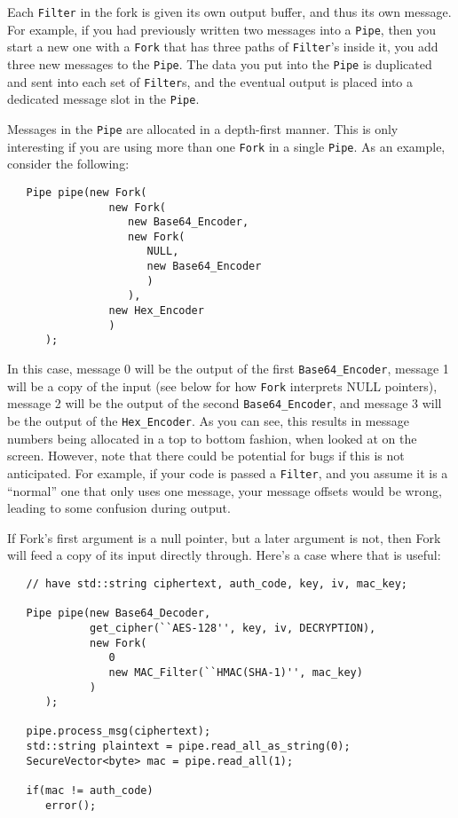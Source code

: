 \documentclass{article}
\newcommand{\type}[1]{\texttt{#1}}
\begin{document}
Each \type{Filter} in the fork is given its own output buffer, and
thus its own message. For example, if you had previously written two
messages into a \type{Pipe}, then you start a new one with a
\type{Fork} that has three paths of \type{Filter}'s inside it, you
add three new messages to the \type{Pipe}. The data you put into the
\type{Pipe} is duplicated and sent into each set of \type{Filter}s,
and the eventual output is placed into a dedicated message slot in the
\type{Pipe}.

Messages in the \type{Pipe} are allocated in a depth-first manner. This is only
interesting if you are using more than one \type{Fork} in a single \type{Pipe}.
As an example, consider the following:

\begin{verbatim}
   Pipe pipe(new Fork(
                new Fork(
                   new Base64_Encoder,
                   new Fork(
                      NULL,
                      new Base64_Encoder
                      )
                   ),
                new Hex_Encoder
                )
      );
\end{verbatim}

In this case, message 0 will be the output of the first \type{Base64\_Encoder},
message 1 will be a copy of the input (see below for how \type{Fork} interprets
NULL pointers), message 2 will be the output of the second
\type{Base64\_Encoder}, and message 3 will be the output of the
\type{Hex\_Encoder}. As you can see, this results in message numbers being
allocated in a top to bottom fashion, when looked at on the screen. However,
note that there could be potential for bugs if this is not anticipated. For
example, if your code is passed a \type{Filter}, and you assume it is a
``normal'' one that only uses one message, your message offsets would be
wrong, leading to some confusion during output.

If Fork's first argument is a null pointer, but a later argument is
not, then Fork will feed a copy of its input directly through. Here's
a case where that is useful:

\begin{verbatim}
   // have std::string ciphertext, auth_code, key, iv, mac_key;

   Pipe pipe(new Base64_Decoder,
             get_cipher(``AES-128'', key, iv, DECRYPTION),
             new Fork(
                0
                new MAC_Filter(``HMAC(SHA-1)'', mac_key)
             )
      );

   pipe.process_msg(ciphertext);
   std::string plaintext = pipe.read_all_as_string(0);
   SecureVector<byte> mac = pipe.read_all(1);

   if(mac != auth_code)
      error();
\end{verbatim}
\end{document}
